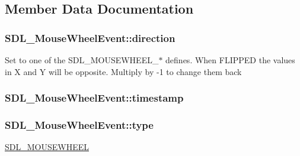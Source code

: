 \subsection{Member Data Documentation}
\subsubsection[{\texorpdfstring{direction}{direction}}]{ S\+D\+L\+\_\+\+Mouse\+Wheel\+Event\+::direction}\hypertarget{struct_s_d_l___mouse_wheel_event_a9fc46552d116499e5b8ca89d66df932c}{}\label{struct_s_d_l___mouse_wheel_event_a9fc46552d116499e5b8ca89d66df932c}
Set to one of the S\+D\+L\+\_\+\+M\+O\+U\+S\+E\+W\+H\+E\+E\+L\+\_\+$\ast$ defines. When F\+L\+I\+P\+P\+ED the values in X and Y will be opposite. Multiply by -\/1 to change them back 
\subsubsection[{\texorpdfstring{timestamp}{timestamp}}]{ S\+D\+L\+\_\+\+Mouse\+Wheel\+Event\+::timestamp}\hypertarget{struct_s_d_l___mouse_wheel_event_a83ad52c80ff49a8e75dc6c33bba65fa0}{}\label{struct_s_d_l___mouse_wheel_event_a83ad52c80ff49a8e75dc6c33bba65fa0}
\subsubsection[{\texorpdfstring{type}{type}}]{ S\+D\+L\+\_\+\+Mouse\+Wheel\+Event\+::type}\hypertarget{struct_s_d_l___mouse_wheel_event_aa6b741e99df708c6f9550ee0f520fb70}{}\label{struct_s_d_l___mouse_wheel_event_aa6b741e99df708c6f9550ee0f520fb70}
\hyperlink{_s_d_l__events_8h_a3b589e89be6b35c02e0dd34a55f3fccaa63135c2e0aea2286f05066f3c0bc5c4e}{S\+D\+L\+\_\+\+M\+O\+U\+S\+E\+W\+H\+E\+EL} 
